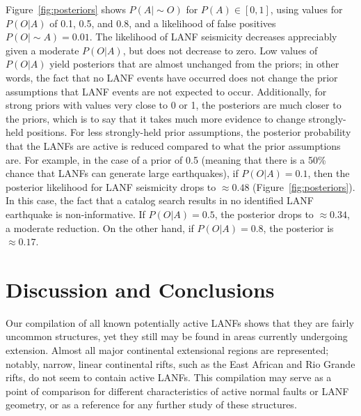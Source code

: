 \documentclass[draft,grl]{AGUTeX}
\begin{document}
\begin{article}
Figure~\ref{fig:posteriors} shows $P(A|\sim O)$ for $P(A) \in [0,1]$, using
values for $P(O|A)$ of 0.1, 0.5, and 0.8, and a likelihood of false positives
$P(O|\sim A)= 0.01$. The likelihood of LANF seismicity decreases appreciably
given a moderate $P(O|A)$, but does not decrease to zero. Low values of
$P(O|A)$ yield posteriors that are almost unchanged from the priors; in other
words, the fact that no LANF events have occurred does not change the prior
assumptions that LANF events are not expected to occur.  Additionally, for
strong priors with values very close to 0 or 1, the posteriors are much closer
to the priors, which is to say that it takes much more evidence to change
strongly-held positions.  For less strongly-held prior assumptions, the
posterior probability that the LANFs are active is reduced compared to what the
prior assumptions are. For example, in the case of a prior of 0.5 (meaning that
there is a 50\% chance that LANFs can generate large earthquakes), if
$P(O|A)=0.1$, then the posterior likelihood for LANF seismicity drops to
$\approx 0.48$ (Figure~\ref{fig:posteriors}). In this case, the fact that
a catalog search results in no identified LANF earthquake is non-informative.
If $P(O|A)=0.5$, the posterior drops to $\approx 0.34$, a moderate reduction.
On the other hand, if $P(O|A)=0.8$, the posterior is $\approx 0.17$.

\section{Discussion and Conclusions}

Our compilation of all known potentially active LANFs shows that they are
fairly uncommon structures, yet they still may be found in areas currently
undergoing extension. Almost all major continental extensional regions are
represented; notably, narrow, linear continental rifts, such as the East
African and Rio Grande rifts, do not seem to contain active LANFs.  This
compilation may serve as a point of comparison for different characteristics of
active normal faults or LANF geometry, or as a reference for any further
study of these structures.


\end{article}
\end{document}
